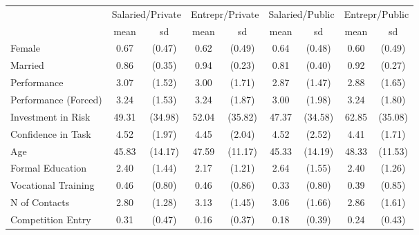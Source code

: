 {
\def\sym#1{\ifmmode^{#1}\else\(^{#1}\)\fi}
\begin{tabular}{l*{4}{cc}}
\toprule
                    &\multicolumn{2}{c}{Salaried/Private}&\multicolumn{2}{c}{Entrepr/Private}&\multicolumn{2}{c}{Salaried/Public}&\multicolumn{2}{c}{Entrepr/Public}\\
                    &        mean&          sd&        mean&          sd&        mean&          sd&        mean&          sd\\
\midrule
Female              &        0.67&      (0.47)&        0.62&      (0.49)&        0.64&      (0.48)&        0.60&      (0.49)\\
Married             &        0.86&      (0.35)&        0.94&      (0.23)&        0.81&      (0.40)&        0.92&      (0.27)\\
Performance         &        3.07&      (1.52)&        3.00&      (1.71)&        2.87&      (1.47)&        2.88&      (1.65)\\
Performance (Forced)&        3.24&      (1.53)&        3.24&      (1.87)&        3.00&      (1.98)&        3.24&      (1.80)\\
Investment in Risk  &       49.31&     (34.98)&       52.04&     (35.82)&       47.37&     (34.58)&       62.85&     (35.08)\\
Confidence in Task  &        4.52&      (1.97)&        4.45&      (2.04)&        4.52&      (2.52)&        4.41&      (1.71)\\
Age                 &       45.83&     (14.17)&       47.59&     (11.17)&       45.33&     (14.19)&       48.33&     (11.53)\\
Formal Education    &        2.40&      (1.44)&        2.17&      (1.21)&        2.64&      (1.55)&        2.40&      (1.26)\\
Vocational Training &        0.46&      (0.80)&        0.46&      (0.86)&        0.33&      (0.80)&        0.39&      (0.85)\\
N of Contacts       &        2.80&      (1.28)&        3.13&      (1.45)&        3.06&      (1.66)&        2.86&      (1.61)\\
Competition Entry   &        0.31&      (0.47)&        0.16&      (0.37)&        0.18&      (0.39)&        0.24&      (0.43)\\
\bottomrule
\end{tabular}
}
